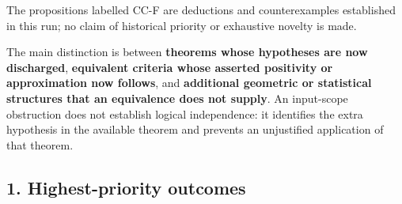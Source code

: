 \documentclass[11pt,a4paper]{article}
\theoremstyle{definition}\newtheorem{definition}[theorem]{Definition}
\theoremstyle{remark}\newtheorem{remark}[theorem]{Remark}
\begin{document}
The propositions labelled CC-F are deductions and counterexamples
established in this run; no claim of historical priority or exhaustive
novelty is made.

The main distinction is between \textbf{theorems whose hypotheses are
now discharged}, \textbf{equivalent criteria whose asserted positivity
or approximation now follows}, and \textbf{additional geometric or
statistical structures that an equivalence does not supply}. An
input-scope obstruction does not establish logical independence: it
identifies the extra hypothesis in the available theorem and prevents an
unjustified application of that theorem.

\subsection{1. Highest-priority
outcomes}\label{highest-priority-outcomes}
\end{document}
